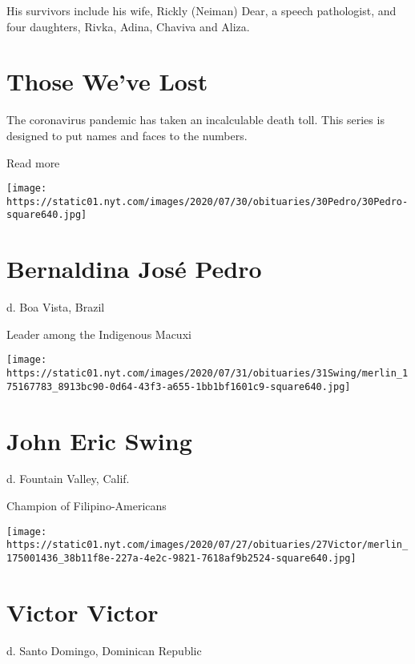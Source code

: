 His survivors include his wife, Rickly (Neiman) Dear, a speech
pathologist, and four daughters, Rivka, Adina, Chaviva and Aliza.

\href{https://www.nytimes.com/interactive/2020/obituaries/people-died-coronavirus-obituaries.html?action=click\&pgtype=Article\&state=default\&region=BELOW_MAIN_CONTENT\&context=covid_obits_promo}{}

\hypertarget{those-weve-lost}{%
\section{Those We've Lost}\label{those-weve-lost}}

The coronavirus pandemic has taken an incalculable death toll. This
series is designed to put names and faces to the numbers.

Read more

\texttt{[image: https://static01.nyt.com/images/2020/07/30/obituaries/30Pedro/30Pedro-square640.jpg]}

\hypertarget{bernaldina-josuxe9-pedro}{%
\section{Bernaldina José Pedro}\label{bernaldina-josuxe9-pedro}}

d. Boa Vista, Brazil

Leader among the Indigenous Macuxi

\texttt{[image: https://static01.nyt.com/images/2020/07/31/obituaries/31Swing/merlin\_175167783\_8913bc90-0d64-43f3-a655-1bb1bf1601c9-square640.jpg]}

\hypertarget{john-eric-swing}{%
\section{John Eric Swing}\label{john-eric-swing}}

d. Fountain Valley, Calif.

Champion of Filipino-Americans

\texttt{[image: https://static01.nyt.com/images/2020/07/27/obituaries/27Victor/merlin\_175001436\_38b11f8e-227a-4e2c-9821-7618af9b2524-square640.jpg]}

\hypertarget{victor-victor}{%
\section{Victor Victor}\label{victor-victor}}

d. Santo Domingo, Dominican Republic

